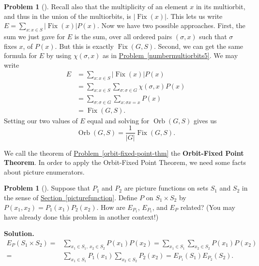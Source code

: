 \documentclass[10pt,]{book}
\newcommand{\terminology}[1]{\textbf{#1}}
\theoremstyle{plain}
\theoremstyle{definition}
\newtheorem{activity}[project]{Problem}
\theoremstyle{definition}
\numberwithin{equation}{chapter}
\DeclareMathOperator{\Fix}{Fix}
\DeclareMathOperator{\Orb}{Orb}
\newcommand{\amp}{&}
\begin{document}
\begin{activity}[]
Recall also that the multiplicity of an element \(x\) in its multiorbit, and thus in the union of the multiorbits, is \(|\Fix(x)|\). This lets us write \(E = \sum_{x\colon x\in S}|\Fix(x)|P(x)\). Now we have two possible approaches. First, the sum we just gave for \(E\) is the sum, over all ordered pairs \((\sigma,x)\) such that \(\sigma\) fixes \(x\), of \(P(x)\). But this is exactly \(\Fix(G,S)\). Second, we can get the same formula for \(E\) by using \(\chi(\sigma,x)\) as in \hyperref[numbermultiorbits5]{Problem~\ref{numbermultiorbits5}}. We may write%
\begin{align*}
E&= \sum_{x\colon x\in S} |\Fix(x)|P(x)\\
&=\sum_{x\colon x\in S}\sum_{\sigma\colon \sigma\in G}\chi(\sigma,x)P(x)\\
&= \sum_{\sigma\colon \sigma\in G}\sum_{x\colon \sigma x=x} P(x)\\
&=\Fix(G,S)\text{.}
\end{align*}
Setting our two values of \(E\) equal and solving for \(\Orb(G,S)\) gives us%
\begin{equation*}
\Orb(G,S) = \frac{1}{|G|}\Fix(G,S)\text{.}
\end{equation*}
%
\end{activity}
We call the theorem of \hyperref[orbit-fixed-point-thm]{Problem~\ref{orbit-fixed-point-thm}} the \terminology{Orbit-Fixed Point Theorem}. In order to apply the Orbit-Fixed Point Theorem, we need some facts about picture enumerators.%
\begin{activity}[]\label{ProdPrincPictureEnumerators}
Suppose that \(P_1\) and \(P_2\) are picture functions on sets \(S_1\) and \(S_2\) in the sense of \hyperref[picturefunction]{Section~\ref{picturefunction}}. Define \(P\) on \(S_1 \times
S_2\) by \(P(x_1,x_2) = P_1(x_1)P_2(x_2)\). How are \(E_{P_1}\), \(E_{P_1}\), and \(E_{P}\) related? (You may have already done this problem in another context!)%
\par\medskip\noindent%
\textbf{Solution.}\quad %
\begin{align*}
E_P(S_1\times S_2) =\amp \sum_{x_1\in S_1,\ x_2\in
S_2}P(x_1)P(x_2)=\sum_{x_1\in S_1}\sum_{x_2 \in S_2}P(x_1)P(x_2)\\
=\amp  \sum_{x_1\in
S_1}P_1(x_1)\sum_{x_2 \in S_2}P_2(x_2)=E_{P_1}(S_1)E_{P_2}(S_2)\text{.}
\end{align*}
%
\end{activity}
\end{document}
